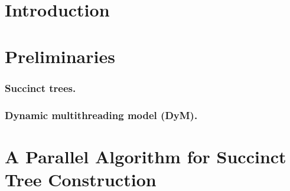 \documentclass[runningheads]{llncs}
\begin{document}
\section{Introduction}
\label{sec:introduction}




\section{Preliminaries}
\label{sec:relwork}
\vspace{-10pt}


\subsubsection{Succinct trees.}
\label{subsec:suctrees}


\subsubsection{Dynamic multithreading model (DyM).}
\label{subsec:dym}


%


\section{A Parallel Algorithm for Succinct Tree Construction}
\label{sec:multicoreST}
%
%

\end{document}
